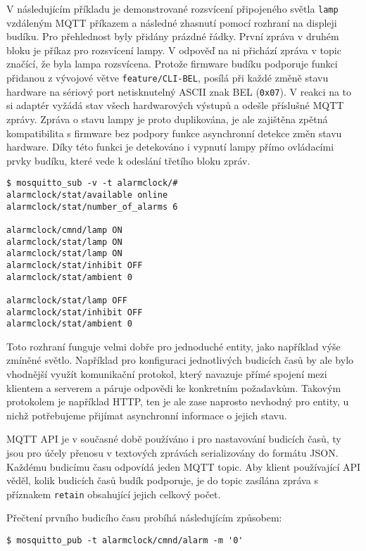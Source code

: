 V následujícím příkladu je demonstrované rozsvícení připojeného světla
\texttt{lamp} vzdáleným MQTT příkazem a následné zhasnutí pomocí rozhraní na
displeji budíku. Pro přehlednost byly přidány prázdné řádky. První zpráva
v druhém bloku je příkaz pro rozsvícení lampy. V odpověď na ni přichází zpráva
v topic  značící, že byla lampa rozsvícena. Protože
firmware budíku podporuje funkci přidanou z vývojové větve
\texttt{feature/CLI-BEL}, posílá při každé změně stavu hardware na sériový port
netisknutelný ASCII znak BEL (\texttt{0x07}). V reakci na to si adaptér vyžádá
stav všech hardwarových výstupů a odešle příslušné MQTT zprávy. Zpráva o stavu
lampy je proto duplikována, je ale zajištěna zpětná kompatibilita s firmware
bez podpory funkce asynchronní detekce změn stavu hardware.
Díky této funkci je detekováno i vypnutí lampy přímo ovládacími prvky budíku,
které vede k odeslání třetího bloku zpráv.
\begin{lstlisting}[style=terminal]
$ mosquitto_sub -v -t alarmclock/#
alarmclock/stat/available online
alarmclock/stat/number_of_alarms 6

alarmclock/cmnd/lamp ON
alarmclock/stat/lamp ON
alarmclock/stat/lamp ON
alarmclock/stat/inhibit OFF
alarmclock/stat/ambient 0

alarmclock/stat/lamp OFF
alarmclock/stat/inhibit OFF
alarmclock/stat/ambient 0
\end{lstlisting}

Toto rozhraní funguje velmi dobře pro jednoduché entity, jako například výše
zmíněné světlo. Například pro konfiguraci jednotlivých budicích časů by ale
bylo vhodnější využít komunikační protokol, který navazuje přímé spojení mezi
klientem a serverem a páruje odpovědi ke konkretním požadavkům. Takovým
protokolem je například HTTP, ten je ale zase naprosto nevhodný pro entity,
u nichž potřebujeme přijímat asynchronní informace o jejich stavu.

MQTT API je v současné době používáno i pro nastavování budicích časů, ty jsou
pro účely přenosu v textových zprávách serializovány do formátu JSON.
Každému budicímu času odpovídá jeden MQTT topic. Aby klient používající API
věděl, kolik budicích časů budík podporuje, je do topic
 zasílána zpráva s příznakem
\texttt{retain} obsahující jejich celkový počet.

Přečtení prvního budicího času probíhá následujícím způsobem:
\begin{lstlisting}[style=terminal]
$ mosquitto_pub -t alarmclock/cmnd/alarm -m '0'
\end{lstlisting}

